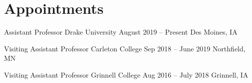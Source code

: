 \section*{Appointments}
\begin{pjob}
    {Assistant Professor}
    {Drake University} 
    {August 2019 -- Present} 
    {Des Moines, IA}
\end{pjob}

\noindent
\begin{pjob}
    {Visiting Assistant Professor}
    {Carleton College} 
    {Sep 2018 -- June 2019} 
    {Northfield, MN}
\end{pjob}

\noindent
\begin{pjob}
    {Visiting Assistant Professor}
    {Grinnell College} 
    {Aug 2016 -- July 2018} 
    {Grinnell, IA}
\end{pjob}

\vspace{-15pt}